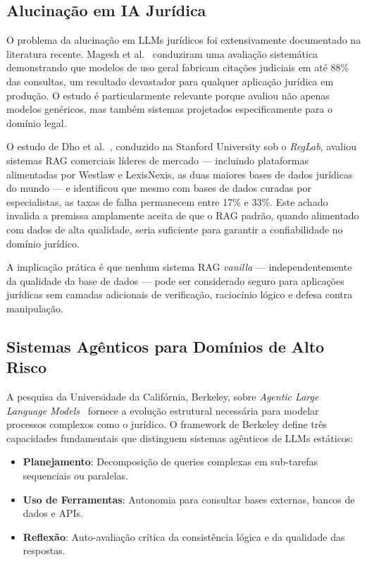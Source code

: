 \documentclass[journal,10pt]{IEEEtran}
\begin{document}
\subsection{Alucina\c{c}\~{a}o em IA Jur\'{i}dica}

O problema da alucina\c{c}\~{a}o em LLMs jur\'{i}dicos foi extensivamente documentado na literatura recente. Magesh et al.~\cite{magesh2024} conduziram uma avalia\c{c}\~{a}o sistem\'{a}tica demonstrando que modelos de uso geral fabricam cita\c{c}\~{o}es judiciais em at\'{e} 88\% das consultas, um resultado devastador para qualquer aplica\c{c}\~{a}o jur\'{i}dica em produ\c{c}\~{a}o. O estudo \'{e} particularmente relevante porque avaliou n\~{a}o apenas modelos gen\'{e}ricos, mas tamb\'{e}m sistemas projetados especificamente para o dom\'{i}nio legal.

O estudo de Dho et al.~\cite{dho2024}, conduzido na Stanford University sob o \textit{RegLab}, avaliou sistemas RAG comerciais l\'{i}deres de mercado --- incluindo plataformas alimentadas por Westlaw e LexisNexis, as duas maiores bases de dados jur\'{i}dicas do mundo --- e identificou que mesmo com bases de dados curadas por especialistas, as taxas de falha permanecem entre 17\% e 33\%. Este achado invalida a premissa amplamente aceita de que o RAG padr\~{a}o, quando alimentado com dados de alta qualidade, seria suficiente para garantir a confiabilidade no dom\'{i}nio jur\'{i}dico.

A implica\c{c}\~{a}o pr\'{a}tica \'{e} que nenhum sistema RAG \textit{vanilla} --- independentemente da qualidade da base de dados --- pode ser considerado seguro para aplica\c{c}\~{o}es jur\'{i}dicas sem camadas adicionais de verifica\c{c}\~{a}o, racioc\'{i}nio l\'{o}gico e defesa contra manipula\c{c}\~{a}o.

\subsection{Sistemas Ag\^{e}nticos para Dom\'{i}nios de Alto Risco}

A pesquisa da Universidade da Calif\'{o}rnia, Berkeley, sobre \textit{Agentic Large Language Models}~\cite{berkeley2025a,berkeley2025b} fornece a evolu\c{c}\~{a}o estrutural necess\'{a}ria para modelar processos complexos como o jur\'{i}dico. O framework de Berkeley define tr\^{e}s capacidades fundamentais que distinguem sistemas ag\^{e}nticos de LLMs est\'{a}ticos:

\begin{itemize}    \item \textbf{Planejamento}: Decomposi\c{c}\~{a}o de queries complexas em sub-tarefas sequenciais ou paralelas.
    \item \textbf{Uso de Ferramentas}: Autonomia para consultar bases externas, bancos de dados e APIs.
    \item \textbf{Reflex\~{a}o}: Auto-avalia\c{c}\~{a}o cr\'{i}tica da consist\^{e}ncia l\'{o}gica e da qualidade das respostas.
\end{itemize}
\end{document}
